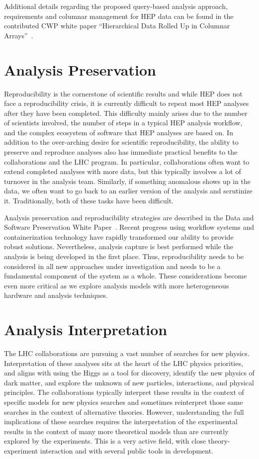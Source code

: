 \documentclass[12pt,a4paper]{article}
\begin{document}
\vskip 0.1in\noindent
Additional details regarding the proposed query-based analysis approach, requirements and columnar management for HEP data can be found in the contributed CWP white paper ``Hierarchical Data Rolled Up in Columnar Arrays''~\cite{Pivarski2017}. 

\section{Analysis Preservation}

Reproducibility is the cornerstone of scientific results and while HEP does not face a reproducibility crisis, it is currently difficult to repeat most HEP analyses after they have been completed. This difficulty mainly arises due to the number of scientists involved, the number of steps in a typical HEP analysis workflow, and the complex ecosystem of software that HEP analyses are based on. In addition to the over-arching desire for scientific reproducibility, the ability to preserve and reproduce analyses also has immediate practical benefits to the collaborations and the LHC program. In particular, collaborations often want to extend completed analyses with more data, but this typically involves a lot of turnover in the analysis team. Similarly, if something anomalous shows up in the data, we often want to go back to an earlier version of the analysis and scrutinize it. Traditionally, both of these tasks have been difficult.  

Analysis preservation and reproducibility strategies are described in the Data and Software Preservation White Paper~\cite{HSF-CWP-2017-06}. Recent progress using workflow systems and containerization technology have rapidly transformed our ability to provide robust solutions. Nevertheless, analysis capture is best performed while the analysis is being developed in the first place. Thus, reproducibility needs to be considered in all new approaches under investigation and needs to be a fundamental component of the system as a whole. These considerations become even more critical as we explore analysis models with more heterogeneous hardware and analysis techniques.

\section{Analysis Interpretation}

The LHC collaborations are pursuing a vast number of searches for new physics. Interpretation of these analyses sits at the heart of the LHC physics priorities, and aligns with using the Higgs as a tool for discovery, identify the new physics of dark matter, and explore the unknown of new particles, interactions, and physical principles. The collaborations typically interpret these results in the context of specific models for new physics searches and sometimes reinterpret those same searches in the context of alternative theories. However, understanding the full implications of these searches requires the interpretation of the experimental results in the context of many more theoretical models than are currently explored by the experiments. This is a very active field, with close theory-experiment interaction and with several public tools in development.
\end{document}
